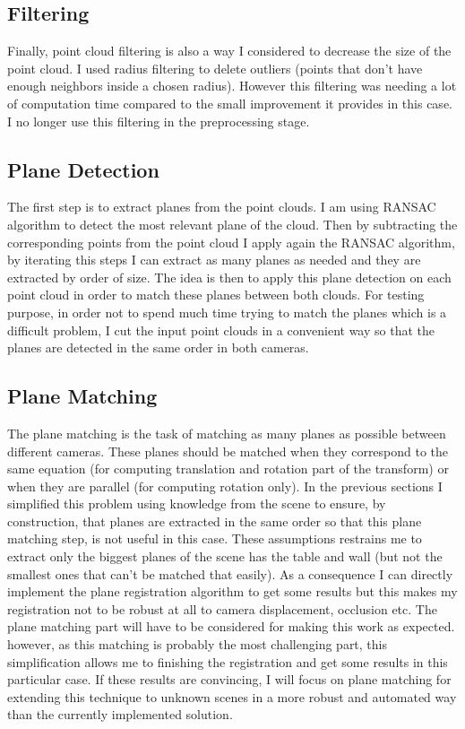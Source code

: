 \subsection{Filtering}

Finally, point cloud filtering is also a way I considered to decrease the size of the point cloud. I used radius filtering to delete outliers (points that don’t have enough neighbors inside a chosen radius). However this filtering was needing a lot of computation time compared to the small improvement it provides in this case. I no longer use this filtering in the preprocessing stage. 

\subsection{Plane Detection}

The first step is to extract planes from the point clouds. I am using RANSAC algorithm to detect the most relevant plane of the cloud. Then by subtracting the corresponding points from the point cloud I apply again the RANSAC algorithm, by iterating this steps I can extract as many planes as needed and they are extracted by order of size. The idea is then to apply this plane detection on each point cloud in order to match these planes between both clouds. For testing purpose, in order not to spend much time trying to match the planes which is a difficult problem, I cut the input point clouds in a convenient way so that the planes are detected in the same order in both cameras. 

\subsection{Plane Matching}

The plane matching is the task of matching as many planes as possible between different cameras. These planes should be matched when they correspond to the same equation (for computing translation and rotation part of the transform) or when they are parallel (for computing rotation only). In the previous sections I simplified this problem using knowledge from the scene to ensure, by construction, that planes are extracted in the same order so that this plane matching step, is not useful in this case. These assumptions restrains me to extract only the biggest planes of the scene has the table and wall (but not the smallest ones that can’t be matched that easily). As a consequence I can directly implement the plane registration algorithm to get some results but this makes my registration not to be robust at all to camera displacement, occlusion etc. The plane matching part will have to be considered for making this work as expected. however, as this matching is probably the most challenging part, this simplification allows me to finishing the registration and get some results in this particular case. If these results are convincing, I will focus on plane matching for extending this technique to unknown scenes in a more robust and automated way than the currently implemented solution.

